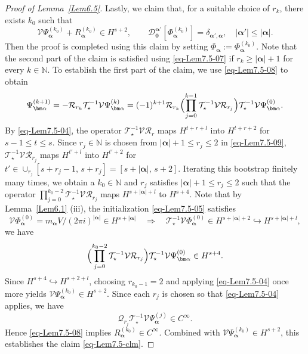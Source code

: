 \documentclass{sn-jnl}%
\numberwithin{equation}{section}
\theoremstyle{thmstyleone}%
\theoremstyle{thmstyletwo}%
\theoremstyle{thmstylethree}%
\begin{document}
\begin{appendices}
\begin{proof}[Proof of Lemma~\ref{Lem6.5}]
Lastly, we claim that, for a suitable choice of $r_k$, there exists $k_0$ such that
\begin{equation}\label{eq-Lem7.5-clm}
\mathcal{V}\Psi_{\bm \alpha}^{(k_0)} 
+
R_{\bm \alpha}^{(k_0)}
\in H^{s+2},\qquad 
\mathcal{D}_{\bm 0}^{\bm \alpha'}[\Phi_{\bm \alpha}^{(k_0)}]
=
\delta_{\bm \alpha',\bm \alpha}, 
\quad
|\bm \alpha'|\leq |\bm \alpha|.
\end{equation}
Then the proof is completed using this claim by setting $\Phi_{\bm \alpha}:=\Phi_{\bm \alpha}^{(k_0)}$. Note that the second part of the claim is satisfied using \eqref{eq-Lem7.5-07} if $r_k \geq |\bm \alpha|+1$ for every $k\in\mathbb{N}$. To establish the first part of the claim, we use \eqref{eq-Lem7.5-08} to obtain
\begin{equation}\label{eq-Lem7.5-09}
    \Psi^{(k+1)}_{\bm \alpha}
    =
    -\mathcal{R}_{r_k}\mathcal{T}_{\star}^{-1}\mathcal{V}\Psi_{\bm \alpha}^{(k)}
    =
    (-1)^{k+1}
    \mathcal{R}_{r_k}
    \Bigl(
    \prod_{j=0}^{k-1}
    \mathcal{T}_{\star}^{-1}\mathcal{V}\mathcal{R}_{r_j}
    \Bigr)
    \mathcal{T}_{\star}^{-1}\mathcal{V}\Psi_{\bm \alpha}^{(0)}.
\end{equation}
By \eqref{eq-Lem7.5-04}, the operator
$\mathcal{T}_{\star}^{-1}\mathcal{V}\mathcal{R}_r$
maps $H^{t+r+l}$ into $H^{t+r+2}$ for
$s-1\leq t\leq s$.
Since $r_j\in \mathbb{N}$ is chosen from $|\bm \alpha|+1\leq r_j\leq 2$ in  \eqref{eq-Lem7.5-09}, 
$\mathcal{T}_{\star}^{-1}\mathcal{V}\mathcal{R}_{r_j}$
maps $H^{t'+l}$ into $H^{t'+2}$ for
$t'\in \cup_{r_j}[s+r_j-1,\,s+r_j]=[s+|\bm \alpha|,\,s+2]$. Iterating this bootstrap finitely many times, we obtain a $k_0\in\mathbb N$ and $r_j$ satisfies $|\bm \alpha|+1\leq r_j\leq 2$ such that the operator 
$\prod_{j=0}^{k_0-2}   \mathcal{T}_{\star}^{-1}\mathcal{V}\mathcal{R}_{r_j}$
maps $H^{s+|\bm \alpha|+l}$ to $H^{s+4}$. Note that by Lemma~\ref{Lem6.1} (iii), the initialization \eqref{eq-Lem7.5-05} satisfies
    \[
        \mathcal{V}\Phi_{\bm \alpha}^{(0)} = m_{\bm \alpha}V/(2\pi i)^{|\bm \alpha|} \in H^{s+|\bm \alpha|} 
        \quad \Longrightarrow \quad 
        \mathcal{T}_{\star}^{-1}\mathcal{V}\Phi_{\bm \alpha}^{(0)}\in H^{s+|\bm \alpha|+2}\hookrightarrow H^{s+|\bm \alpha|+l},
    \]
we have
\begin{equation}\label{eq-Lem7.5-10}
    \Bigl(
    \prod_{j=0}^{k_0-2}
    \mathcal{T}_{\star}^{-1}\mathcal{V}\mathcal{R}_{r_j}
    \Bigr)
    \mathcal{T}_{\star}^{-1}\mathcal{V}\Psi_{\bm \alpha}^{(0)} \in H^{s+4}.
\end{equation}
Since $H^{s+4}\hookrightarrow H^{s+2+l}$, choosing
$r_{k_0-1}=2$ and applying \eqref{eq-Lem7.5-04} once more yields $\mathcal{V}\Psi^{(k_0)}_{\bm \alpha}\in H^{s+2}$. Since each $r_j$ is chosen so that \eqref{eq-Lem7.5-04} applies, we have
\[
\mathcal{Q}_{r_j}\mathcal{T}_{\star}^{-1}\mathcal{V}\Psi^{(j)}_{\bm \alpha}
\in C^{\infty}.
\]
Hence \eqref{eq-Lem7.5-08} implies $R^{(k_0)}_{\bm \alpha}\in C^{\infty}$. Combined with $\mathcal{V}\Psi_{\bm \alpha}^{(k_0)}\in H^{s+2}$, this establishes the claim \eqref{eq-Lem7.5-clm}.
\end{proof}


\end{appendices}
\end{document}
